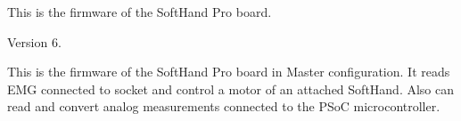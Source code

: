 This is the firmware of the Soft\+Hand Pro board. \begin{DoxyVersion}{Version}
6.
\end{DoxyVersion}
This is the firmware of the Soft\+Hand Pro board in Master configuration. It reads EMG connected to socket and control a motor of an attached Soft\+Hand. Also can read and convert analog measurements connected to the PSoC microcontroller. ~\newline
 